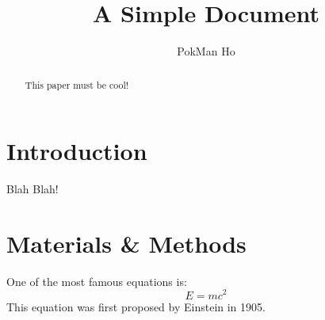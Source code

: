 \documentclass[12pt]{article}
\title{A Simple Document}
\author{PokMan Ho}
\date{}
\begin{document}
	\maketitle
	\begin{abstract}
		This paper must be cool!
	\end{abstract}
	\section{Introduction}
		Blah Blah!
	\section{Materials \& Methods}
	One of the most famous equations is:
	\begin{equation}
		E = mc^2
	\end{equation}
	This equation was first proposed by Einstein in 1905\cite{einstein1905does}.

	
	
\end{document}
